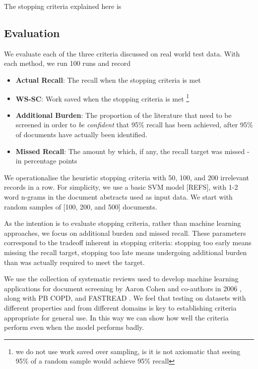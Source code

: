 \documentclass{bmcart}
\begin{document}
	The stopping criteria explained here is 
	
	\subsection*{Evaluation}
	
	We evaluate each of the three criteria discussed on real world test data. With each method, we run 100 runs and record 
	\begin{itemize}
		\item \textbf{Actual Recall}: The recall when the stopping criteria is met
		\item \textbf{WS-SC}: Work saved when the stopping criteria is met \footnote{we do not use work saved over sampling, is it is not axiomatic that seeing 95\% of a random sample would achieve 95\% recall}
		\item \textbf{Additional Burden}: The proportion of the literature that need to be screened in order to \textit{be confident} that 95\% recall has been achieved, after 95\% of documents have actually been identified.
		\item \textbf{Missed Recall}: The amount by which, if any, the recall target was missed - in percentage points
	\end{itemize}
	We operationalise the heuristic stopping criteria with 50, 100, and 200 irrelevant records in a row. For simplicity, we use a basic SVM model [REFS], with 1-2 word n-grams in the document abstracts used as input data. We start with random samples of [100, 200, and 500] documents.
	
	As the intention is to evaluate stopping criteria, rather than machine learning approaches, we focus on additional burden and missed recall. These parameters correspond to the tradeoff inherent in stopping criteria: stopping too early means missing the recall target, stopping too late means undergoing additional burden than was actually required to meet the target.
	
	
	
	
	We use the collection of systematic reviews used to develop machine learning applications for document screening by Aaron Cohen and co-authors in 2006 \cite{Cohen2006}, along with PB COPD, and FASTREAD . We feel that testing on datasets with different properties and from different domains is key to establishing criteria appropriate for general use. In this way we can show how well the criteria perform even when the model performs badly.
	
\end{document}

